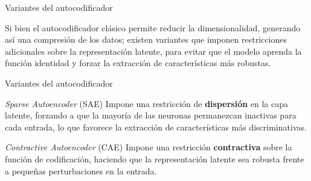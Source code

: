 \documentclass{beamer}
\begin{document}
\begin{frame}{Variantes del autocodificador}
	\small
	\justifying
	
	\begin{block}{}
		Si bien el autocodificador clásico permite reducir la dimensionalidad, generando así una compresión de los datos; existen variantes que imponen restricciones adicionales sobre la representación latente, para evitar que el modelo aprenda la función identidad y forzar la extracción de características más robustas.
	\end{block}

	\vspace{0.5cm}
	
	\centering
\end{frame}

\begin{frame}{Variantes del autocodificador}
	\justifying
	\small
	\begin{block}{\emph{Sparse Autoencoder} (SAE)}
		Impone una restricción de \textbf{dispersión} en la capa latente, forzando a que la mayoría de las neuronas permanezcan inactivas para cada entrada, lo que favorece la extracción de características más discriminativas.
	\end{block}
	
	\vspace{0.3cm}
	
	\begin{block}{\emph{Contractive Autoencoder} (CAE)}
		Impone una restricción \textbf{contractiva} sobre la función de codificación, haciendo que la representación latente sea robusta frente a pequeñas perturbaciones en la entrada.
	\end{block}
	
\end{frame}
\end{document}
